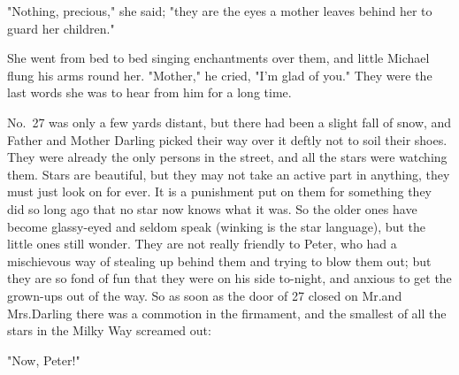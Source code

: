 "Nothing, precious," she said;
"they are the eyes a mother leaves behind her to guard her children."

She went from bed to bed singing enchantments over them,
and little Michael flung his arms round her.
"Mother," he cried, "I'm glad of you."
They were the last words she was to hear from him for a long time.

No.~27 was only a few yards distant,
but there had been a slight fall of snow,
and Father and Mother Darling picked their way over it deftly not to soil their shoes.
They were already the only persons in the street, and all the stars were watching them.
Stars are beautiful, but they may not take an active part in anything, they must just look on for ever.
It is a punishment put on them for something they did so long ago that no star now knows what it was.
So the older ones have become glassy-eyed and seldom speak (winking is the star language),
but the little ones still wonder.
They are not really friendly to Peter,
who had a mischievous way of stealing up behind them and trying to blow them out;
but they are so fond of fun that they were on his side to-night,
and anxious to get the grown-ups out of the way.
So as soon as the door of 27 closed on Mr.\@ and Mrs.\@ Darling there was a commotion in the firmament,
and the smallest of all the stars in the Milky Way screamed out:

"Now, Peter!"

\endinput
